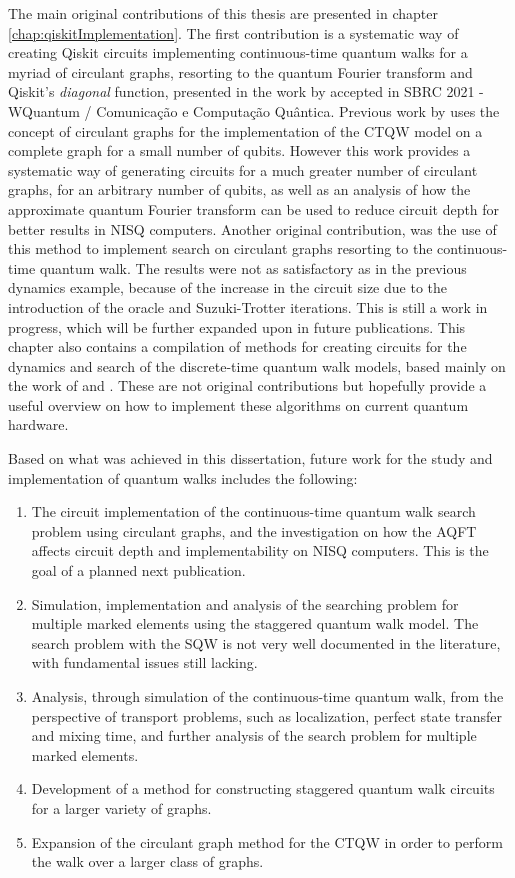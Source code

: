 \documentclass[../../dissertation.tex]{subfiles}
\begin{document}
The main original contributions of this thesis are presented in chapter
\ref{chap:qiskitImplementation}. The first contribution is a systematic way of creating Qiskit circuits implementing continuous-time quantum walks
for a myriad of circulant graphs, resorting to the quantum Fourier transform and
Qiskit's \textit{diagonal} function, presented in the work by \cite{chagassantos21} accepted in SBRC 2021 - WQuantum / Comunicação e Computação Quântica. Previous work by \cite{qiang2016} uses
the concept of circulant graphs for the implementation of the CTQW model on a
complete graph for a small number of qubits. However this work provides
a systematic way of generating circuits for a much greater number of circulant
graphs, for an arbitrary number of qubits, as well as an analysis of how the
approximate quantum Fourier transform can be used to reduce circuit depth for
better results in NISQ computers. 
Another original contribution, was the use of this method to implement search on circulant graphs
resorting to the continuous-time quantum walk. The results were not as satisfactory
as in the previous dynamics example, because of the increase in the circuit size due
to the introduction of the oracle and Suzuki-Trotter iterations. This is still
a work in progress, which will be further expanded upon in future publications.
This chapter also contains a compilation of methods for creating circuits for
the dynamics and search of the discrete-time quantum walk models, based mainly
on the work of \cite{douglaswang07} and \cite{acasiete2020}. These are not
original contributions but hopefully provide a useful overview on how to
implement these algorithms on current quantum hardware.\par

Based on what was achieved in this dissertation, future work for the study and
implementation of quantum walks includes the following:
\begin{enumerate}
	\item The circuit implementation of the continuous-time quantum walk search problem using circulant graphs, and the investigation on how the AQFT affects circuit depth and implementability on NISQ computers. This is the goal of a planned next publication.
	\item Simulation, implementation and analysis of the searching problem for multiple marked elements using the staggered quantum walk model. The search problem with the SQW is not very well documented in the literature, with fundamental issues still lacking.
	\item Analysis, through simulation of the continuous-time quantum walk, from the perspective of transport problems, such as localization, perfect state transfer and mixing time, and further analysis of the search problem for multiple marked elements.
	\item Development of a method for constructing staggered quantum walk circuits for a larger variety of graphs.
	\item Expansion of the circulant graph method for the CTQW in order to perform the walk over a larger class of graphs.
\end{enumerate}
\end{document}
